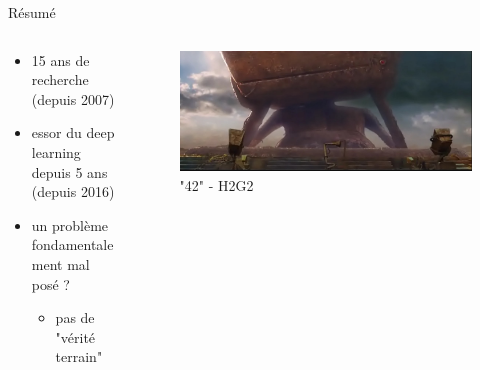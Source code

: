 \documentclass[9pt, aspectratio=169]{beamer}
\begin{document}
\begin{frame}{Résumé} %
\begin{columns}
    \begin{column}{0.58\textwidth}
    
\begin{itemize}
	\item 15 ans de recherche (depuis 2007)
	\item essor du deep learning depuis 5 ans (depuis 2016)
	\item un problème fondamentalement mal posé ?
	\begin{itemize}
		\item pas de "vérité terrain" \cite{birtchnell_automating_2018}
	\end{itemize}
\end{itemize}

\end{column}
    \begin{column}{0.42\textwidth}
    \begin{figure}
    \includegraphics[width=\textwidth]{fig/deep_thought.jpg}
    \caption{"42" - H2G2}    
    \end{figure}

    \end{column}
\end{columns}
\end{frame}
\end{document}
